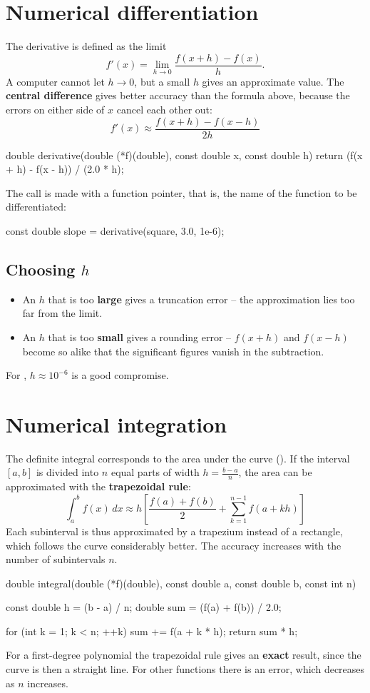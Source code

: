\section{Numerical differentiation}
\label{c18:sec:derivering}
The derivative is defined as the limit
\[
  f'(x) = \lim_{h \to 0} \frac{f(x + h) - f(x)}{h}.
\]
A computer cannot let $h \to 0$, but a small $h$ gives an approximate value. The \textbf{central
difference} gives better accuracy than the formula above, because the errors on either side of
$x$ cancel each other out:
\[
  f'(x) \approx \frac{f(x + h) - f(x - h)}{2h}
\]
\begin{ccode}
double derivative(double (*f)(double), const double x, const double h)
{
    return (f(x + h) - f(x - h)) / (2.0 * h);
}
\end{ccode}
The call is made with a function pointer, that is, the name of the function to be
differentiated:
\begin{ccode}
const double slope = derivative(square, 3.0, 1e-6);
\end{ccode}

\subsection{Choosing \texorpdfstring{$h$}{h}}
\label{c18:sec:valh}
\begin{itemize}
  \item An $h$ that is too \textbf{large} gives a truncation error -- the approximation lies too
    far from the limit.
  \item An $h$ that is too \textbf{small} gives a rounding error -- $f(x + h)$ and $f(x - h)$
    become so alike that the significant figures vanish in the subtraction.
\end{itemize}
For , $h \approx 10^{-6}$ is a good compromise.

\section{Numerical integration}
\label{c18:sec:integrering}
The definite integral corresponds to the area under the curve (). If the interval
$[a, b]$ is divided into $n$ equal parts of width $h = \frac{b - a}{n}$, the area can be
approximated with the \textbf{trapezoidal rule}:
\[
  \int_a^b f(x)\,dx \approx h\left[\frac{f(a) + f(b)}{2} + \sum_{k=1}^{n-1} f(a + kh)\right]
\]
Each subinterval is thus approximated by a trapezium instead of a rectangle, which follows the
curve considerably better. The accuracy increases with the number of subintervals $n$.
\begin{ccode}
double integral(double (*f)(double), const double a, const double b, const int n)
{
    const double h = (b - a) / n;
    double sum     = (f(a) + f(b)) / 2.0;

    for (int k = 1; k < n; ++k)
    {
        sum += f(a + k * h);
    }
    return sum * h;
}
\end{ccode}
For a first-degree polynomial the trapezoidal rule gives an \textbf{exact} result, since the curve
is then a straight line. For other functions there is an error, which decreases as $n$ increases.


